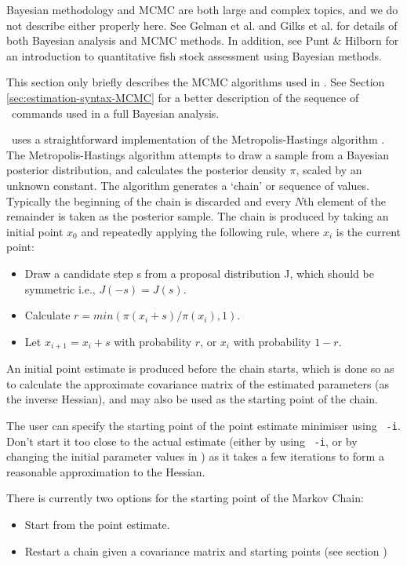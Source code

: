 Bayesian methodology and MCMC are both large and complex topics, and we do not describe either properly here. See Gelman et al. \citeyearpar{823} and Gilks et al. \citeyearpar{143} for details of both Bayesian analysis and MCMC methods. In addition, see Punt \& Hilborn \citeyearpar{828} for an introduction to quantitative fish stock assessment using Bayesian methods. 

This section only briefly describes the MCMC algorithms used in \CNAME. See Section \ref{sec:estimation-syntax-MCMC} for a better description of the sequence of \CNAME\ commands used in a full Bayesian analysis.

\CNAME\ uses a straightforward implementation of the Metropolis-Hastings algorithm \citep{823,143}. The Metropolis-Hastings algorithm attempts to draw a sample from a Bayesian posterior distribution, and calculates the posterior density $\pi$, scaled by an unknown constant. The algorithm generates a `chain' or sequence of values. Typically the beginning of the chain is discarded and every $N$th element of the remainder is taken as the posterior sample. The chain is produced by taking an initial point $x_0$ and repeatedly applying the following rule, where $x_i$ is the current point: 

\begin{itemize}
\item Draw a candidate step s from a proposal distribution J, which should be symmetric i.e., $J(-s)=J(s)$.
\item Calculate $r=min(\pi(x_i+s)/\pi(x_i),1)$. 
\item Let $x_{i+1}=x_i+s$ with probability $r$, or $x_i$ with probability $1-r$.
\end{itemize}

An initial point estimate is produced before the chain starts, which is done so as to calculate the approximate covariance matrix of the estimated parameters (as the inverse Hessian), and may also be used as the starting point of the chain. 

The user can specify the starting point of the point estimate minimiser using \texttt{\cname\ -i}. Don't start it too close to the actual estimate (either by using \texttt{\cname\ -i}, or by changing the initial parameter values in \config) as it takes a few iterations to form a reasonable approximation to the Hessian. 

There is currently two options for the starting point of the Markov Chain: 

\begin{itemize}
\item Start from the point estimate.
\item Restart a chain given a covariance matrix and starting points (see section ) 
\end{itemize}

